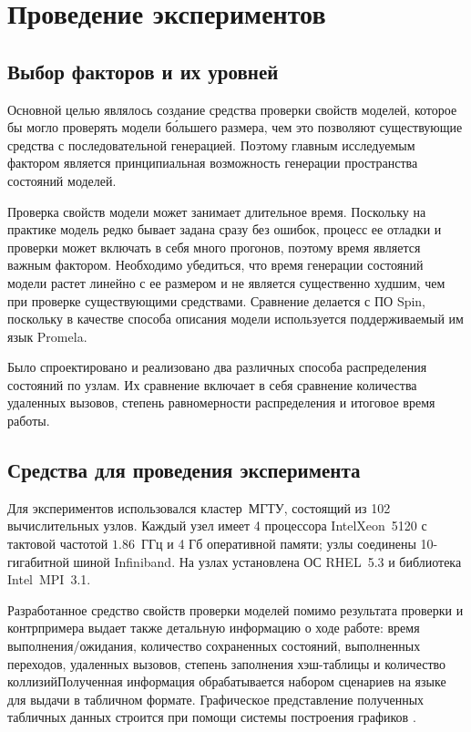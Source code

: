 \chapter{Проведение экспериментов}
\label{cha:experiments}

\section{Выбор факторов и их уровней}
\label{sec:experiment-strategy}

Основной целью являлось создание средства проверки свойств моделей, которое бы могло
проверять модели б\'{о}льшего размера, чем это позволяют существующие средства с
последовательной генерацией. Поэтому главным исследуемым фактором является принципиальная
возможность генерации пространства состояний моделей.

Проверка свойств модели может занимает длительное время. Поскольку на практике модель
редко бывает задана сразу без ошибок, процесс ее отладки и проверки может включать в себя
много прогонов, поэтому время является важным фактором. Необходимо убедиться, что время
генерации состояний модели растет линейно с ее размером и не является существенно худшим,
чем при проверке существующими средствами. Сравнение делается с ПО Spin, поскольку в
качестве способа описания модели используется поддерживаемый им язык Promela.

Было спроектировано и реализовано два различных способа распределения состояний по
узлам. Их сравнение включает в себя сравнение количества удаленных вызовов, степень
равномерности распределения и итоговое время работы.

\section{Средства для проведения эксперимента}
\label{sec:experiment-idef0}

Для экспериментов использовался кластер~МГТУ, состоящий из 102 вычислительных
узлов. Каждый узел имеет 4 процессора Intel\regsign Xeon\regsign~5120 с тактовой частотой
$1.86$~ГГц и 4 Гб оперативной памяти; узлы соединены 10-гигабитной шиной Infiniband. На
узлах установлена ОС RHEL~5.3 и библиотека Intel~MPI~3.1.

Разработанное средство свойств проверки моделей помимо результата проверки и контрпримера
выдает также детальную информацию о ходе работе: время выполнения/ожидания, количество
сохраненных состояний, выполненных переходов, удаленных вызовов, степень заполнения
хэш-таблицы и количество коллизий\etc Полученная информация обрабатывается набором
сценариев на языке  для выдачи в табличном формате. Графическое представление
полученных табличных данных строится при помощи системы построения графиков .

